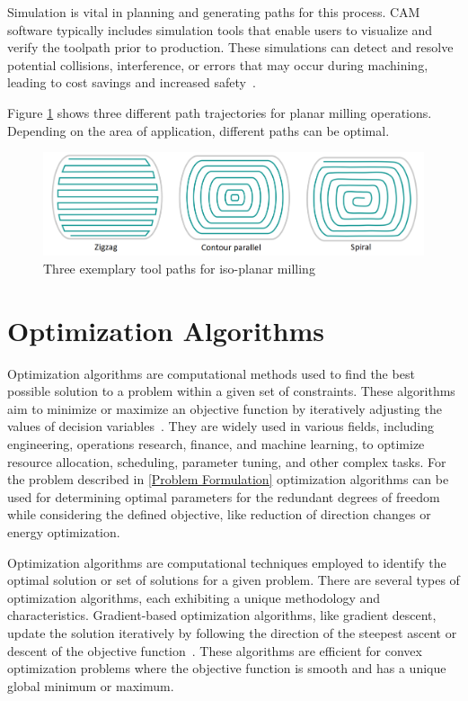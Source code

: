 Simulation is vital in planning and generating paths for this process. CAM software typically includes simulation tools that enable users to visualize and verify the toolpath prior to production. These simulations can detect and resolve potential collisions, interference, or errors that may occur during machining, leading to cost savings and increased safety~\cite{Dubovska.2014}. 

Figure \ref{3path} shows three different path trajectories for planar milling operations. Depending on the area of application, different paths can be optimal. 

\begin{figure}[H]
	\centerline{\includegraphics[scale=.35]{figures/path.png}}
	\caption{Three exemplary tool paths for iso-planar milling~\cite{Zhao.2018}}
	\label{3path}
\end{figure}

\section{Optimization Algorithms}%

Optimization algorithms are computational methods used to find the best possible solution to a problem within a given set of constraints. These algorithms aim to minimize or maximize an objective function by iteratively adjusting the values of decision variables~\cite{Sivanandam.2007b}. They are widely used in various fields, including engineering, operations research, finance, and machine learning, to optimize resource allocation, scheduling, parameter tuning, and other complex tasks. For the problem described in \ref{Problem Formulation} optimization algorithms can be used for determining optimal parameters for the redundant degrees of freedom while considering the defined objective, like reduction of direction changes or energy optimization. 


Optimization algorithms are computational techniques employed to identify the optimal solution or set of solutions for a given problem. There are several types of optimization algorithms, each exhibiting a unique methodology and characteristics. Gradient-based optimization algorithms, like gradient descent, update the solution iteratively by following the direction of the steepest ascent or descent of the objective function~\cite{Ruder.2017}. These algorithms are efficient for convex optimization problems where the objective function is smooth and has a unique global minimum or maximum.

